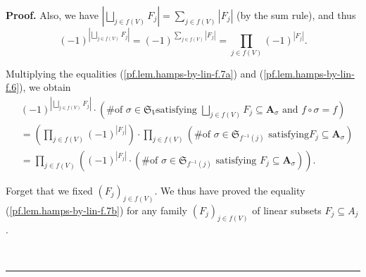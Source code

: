 \documentclass[numbers=enddot,12pt,final,onecolumn,notitlepage]{scrartcl}%
\numberwithin{exer}{section}
\theoremstyle{definition}
\newenvironment{proof}[1][Proof]{\noindent\textbf{#1.} }{\ \rule{0.5em}{0.5em}}
\let\sumnonlimits\sum
\let\prodnonlimits\prod
\let\sqcupnonlimits\bigsqcup
\renewcommand{\sum}{\sumnonlimits\limits}
\renewcommand{\prod}{\prodnonlimits\limits}
\renewcommand{\bigsqcup}{\sqcupnonlimits\limits}
\newenvironment{verlong}{}{}
\begin{document}
\begin{verlong}
\begin{proof}
Also, we have $\left\vert \bigsqcup_{j\in f\left(  V\right)  }F_{j}\right\vert
=\sum_{j\in f\left(  V\right)  }\left\vert F_{j}\right\vert $ (by the sum
rule), and thus%
\begin{equation}
\left(  -1\right)  ^{\left\vert \bigsqcup_{j\in f\left(  V\right)  }%
F_{j}\right\vert }=\left(  -1\right)  ^{\sum_{j\in f\left(  V\right)
}\left\vert F_{j}\right\vert }=\prod_{j\in f\left(  V\right)  }\left(
-1\right)  ^{\left\vert F_{j}\right\vert }. \label{pf.lem.hamps-by-lin-f.7a}%
\end{equation}


Multiplying the equalities (\ref{pf.lem.hamps-by-lin-f.7a}) and
(\ref{pf.lem.hamps-by-lin-f.6}), we obtain%
\begin{align}
&  \left(  -1\right)  ^{\left\vert \bigsqcup_{j\in f\left(  V\right)  }%
F_{j}\right\vert }\cdot\left(  \text{\# of }\sigma\in\mathfrak{S}_{V}\text{
satisfying }\bigsqcup_{j\in f\left(  V\right)  }F_{j}\subseteq\mathbf{A}%
_{\sigma}\text{ and }f\circ\sigma=f\right) \nonumber\\
&  =\left(  \prod_{j\in f\left(  V\right)  }\left(  -1\right)  ^{\left\vert
F_{j}\right\vert }\right)  \cdot\prod_{j\in f\left(  V\right)  }\left(
\text{\# of }\sigma\in\mathfrak{S}_{f^{-1}\left(  j\right)  }\text{ satisfying
}F_{j}\subseteq\mathbf{A}_{\sigma}\right) \nonumber\\
&  =\prod_{j\in f\left(  V\right)  }\left(  \left(  -1\right)  ^{\left\vert
F_{j}\right\vert }\cdot\left(  \text{\# of }\sigma\in\mathfrak{S}%
_{f^{-1}\left(  j\right)  }\text{ satisfying }F_{j}\subseteq\mathbf{A}%
_{\sigma}\right)  \right)  . \label{pf.lem.hamps-by-lin-f.7b}%
\end{align}


Forget that we fixed $\left(  F_{j}\right)  _{j\in f\left(  V\right)  }$. We
thus have proved the equality (\ref{pf.lem.hamps-by-lin-f.7b}) for any family
$\left(  F_{j}\right)  _{j\in f\left(  V\right)  }$ of linear subsets
$F_{j}\subseteq A_{j}$.


\end{proof}
\end{verlong}
\end{document}
